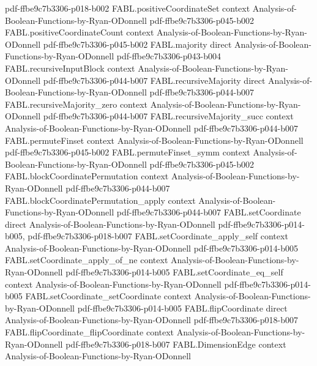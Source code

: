 \begin{theorem}
  {pdf-ffbe9c7b3306-p018-b002}
\proofstep
  {FABL.positiveCoordinateSet}
  {context}
  {Analysis-of-Boolean-Functions-by-Ryan-ODonnell}
  {pdf-ffbe9c7b3306-p045-b002}
\proofstep
  {FABL.positiveCoordinateCount}
  {context}
  {Analysis-of-Boolean-Functions-by-Ryan-ODonnell}
  {pdf-ffbe9c7b3306-p045-b002}
\proofstep
  {FABL.majority}
  {direct}
  {Analysis-of-Boolean-Functions-by-Ryan-ODonnell}
  {pdf-ffbe9c7b3306-p043-b004}
\proofstep
  {FABL.recursiveInputBlock}
  {context}
  {Analysis-of-Boolean-Functions-by-Ryan-ODonnell}
  {pdf-ffbe9c7b3306-p044-b007}
\proofstep
  {FABL.recursiveMajority}
  {direct}
  {Analysis-of-Boolean-Functions-by-Ryan-ODonnell}
  {pdf-ffbe9c7b3306-p044-b007}
\proofstep
  {FABL.recursiveMajority_zero}
  {context}
  {Analysis-of-Boolean-Functions-by-Ryan-ODonnell}
  {pdf-ffbe9c7b3306-p044-b007}
\proofstep
  {FABL.recursiveMajority_succ}
  {context}
  {Analysis-of-Boolean-Functions-by-Ryan-ODonnell}
  {pdf-ffbe9c7b3306-p044-b007}
\proofstep
  {FABL.permuteFinset}
  {context}
  {Analysis-of-Boolean-Functions-by-Ryan-ODonnell}
  {pdf-ffbe9c7b3306-p045-b002}
\proofstep
  {FABL.permuteFinset_symm}
  {context}
  {Analysis-of-Boolean-Functions-by-Ryan-ODonnell}
  {pdf-ffbe9c7b3306-p045-b002}
\proofstep
  {FABL.blockCoordinatePermutation}
  {context}
  {Analysis-of-Boolean-Functions-by-Ryan-ODonnell}
  {pdf-ffbe9c7b3306-p044-b007}
\proofstep
  {FABL.blockCoordinatePermutation_apply}
  {context}
  {Analysis-of-Boolean-Functions-by-Ryan-ODonnell}
  {pdf-ffbe9c7b3306-p044-b007}
\proofstep
  {FABL.setCoordinate}
  {direct}
  {Analysis-of-Boolean-Functions-by-Ryan-ODonnell}
  {pdf-ffbe9c7b3306-p014-b005,
    pdf-ffbe9c7b3306-p018-b007}
\proofstep
  {FABL.setCoordinate_apply_self}
  {context}
  {Analysis-of-Boolean-Functions-by-Ryan-ODonnell}
  {pdf-ffbe9c7b3306-p014-b005}
\proofstep
  {FABL.setCoordinate_apply_of_ne}
  {context}
  {Analysis-of-Boolean-Functions-by-Ryan-ODonnell}
  {pdf-ffbe9c7b3306-p014-b005}
\proofstep
  {FABL.setCoordinate_eq_self}
  {context}
  {Analysis-of-Boolean-Functions-by-Ryan-ODonnell}
  {pdf-ffbe9c7b3306-p014-b005}
\proofstep
  {FABL.setCoordinate_setCoordinate}
  {context}
  {Analysis-of-Boolean-Functions-by-Ryan-ODonnell}
  {pdf-ffbe9c7b3306-p014-b005}
\proofstep
  {FABL.flipCoordinate}
  {direct}
  {Analysis-of-Boolean-Functions-by-Ryan-ODonnell}
  {pdf-ffbe9c7b3306-p018-b007}
\proofstep
  {FABL.flipCoordinate_flipCoordinate}
  {context}
  {Analysis-of-Boolean-Functions-by-Ryan-ODonnell}
  {pdf-ffbe9c7b3306-p018-b007}
\proofstep
  {FABL.DimensionEdge}
  {context}
  {Analysis-of-Boolean-Functions-by-Ryan-ODonnell}

\end{theorem}
